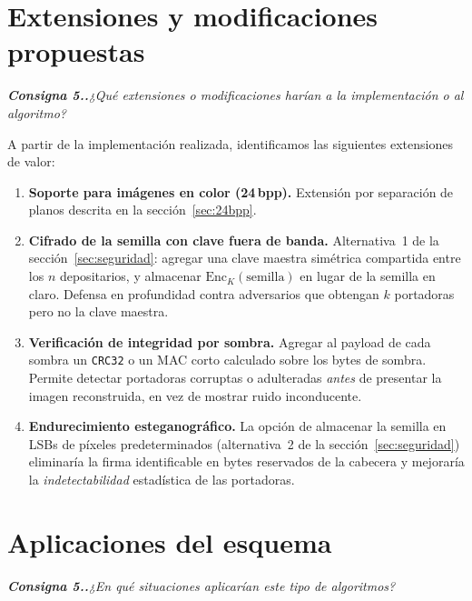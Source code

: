 \documentclass[11pt,a4paper]{article}
\newcommand{\pregunta}[1]{%
    \begingroup
    \itshape\small\color{gray!30!black}\textbf{Consigna 5.\arabic{section}.}\enspace #1\par\medskip
    \endgroup
}
\begin{document}
\section{Extensiones y modificaciones propuestas}\label{sec:mejoras}
\pregunta{¿Qué extensiones o modificaciones harían a la implementación
o al algoritmo?}

A partir de la implementación realizada, identificamos las siguientes
extensiones de valor:

\begin{enumerate}[leftmargin=*]
    \item \textbf{Soporte para imágenes en color (24\,bpp).} Extensión por
          separación de planos descrita en la
          sección~\ref{sec:24bpp}.

    \item \textbf{Cifrado de la semilla con clave fuera de banda.}
          Alternativa~1 de la sección~\ref{sec:seguridad}: agregar una
          clave maestra simétrica compartida entre los $n$ depositarios,
          y almacenar $\mathrm{Enc}_K(\text{semilla})$ en lugar de la
          semilla en claro. Defensa en profundidad contra adversarios que
          obtengan $k$ portadoras pero no la clave maestra.

    \item \textbf{Verificación de integridad por sombra.} Agregar al
          payload de cada sombra un \texttt{CRC32} o un MAC corto
          calculado sobre los bytes de sombra. Permite detectar
          portadoras corruptas o adulteradas \emph{antes} de presentar la
          imagen reconstruida, en vez de mostrar ruido inconducente.

    \item \textbf{Endurecimiento esteganográfico.} La opción de almacenar
          la semilla en LSBs de píxeles predeterminados (alternativa~2 de
          la sección~\ref{sec:seguridad}) eliminaría la firma identificable
          en bytes reservados de la cabecera y mejoraría la
          \emph{indetectabilidad} estadística de las portadoras.
\end{enumerate}

\section{Aplicaciones del esquema}\label{sec:aplicaciones}
\pregunta{¿En qué situaciones aplicarían este tipo de algoritmos?}
\end{document}
